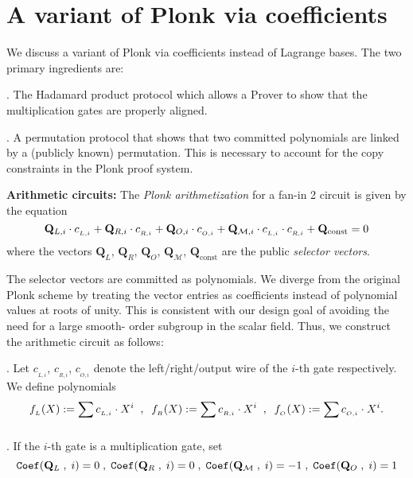 \documentclass[11pt, lettersize, notitlepage, leqno, footskip=0.6cm]{article}
\newcommand{\mc}{\mathcal}
\newcommand{\mbf}{\mathbf}
\newcommand{\mr}{\mathrm}
\newcommand{\vs}{\vspace{-0.15cm}}
\newcommand{\noin}{\noindent}
\numberwithin{equation}{section}
\begin{document}
\section{\fontsize{11}{11}\selectfont A variant of Plonk via coefficients}

We discuss a variant of Plonk via coefficients instead of Lagrange bases. The two primary ingredients are: \vspace{2mm}

\noin 1. The Hadamard product protocol which allows a Prover to show that the multiplication gates are properly aligned. \vspace{1mm}

\noin 2. A permutation protocol that shows that two committed polynomials are linked by a (publicly known) permutation. This is necessary to account for the copy constraints in the Plonk proof system. \bigskip

\noin \textbf{Arithmetic circuits:} The \textit{Plonk arithmetization} for a fan-in 2 circuit is given by the equation \vs $$ \mbf{Q}_{L,i}\cdot c_{_{L,i}} + \mbf{Q}_{R,i}\cdot c_{_{R,i}} + \mbf{Q}_{O,i}\cdot c_{_{O,i}} +  \mbf{Q}_{\mc{M},i}\cdot c_{_{L,i}}\cdot c_{_{R,i}} + \mbf{Q}_{\mr{const}} = 0 \vs $$ where the vectors $\mbf{Q}_{L}$, $\mbf{Q}_{R}$, $\mbf{Q}_{O}$, $\mbf{Q}_{\mc{M}}$, $\mbf{Q}_{\mr{const}}$ are the public \textit{selector vectors}. \vspace{1.5mm}

The selector vectors are committed as polynomials. We diverge from the original Plonk scheme by treating the vector entries as coefficients instead of polynomial values at roots of unity. This is consistent with our design goal of avoiding the need for a large smooth- order subgroup in the scalar field. Thus, we construct the arithmetic circuit as follows: \vspace{2mm}

\noin 1. Let $c_{_{L,i}}$, $c_{_{R,i}}$, $c_{_{O,i}}$ denote the left/right/output wire of the $i$-th gate respectively. We define polynomials \vs $$ f_{_L}(X):= \sum\limits_{} c_{_{L,i}}\cdot X^i\;\;,\;\;f_{_R}(X):= \sum\limits_{} c_{_{R,i}}\cdot X^i\;\;,\;\;f_{_O}(X):= \sum\limits_{} c_{_{O,i}}\cdot X^i.  \vs  $$

\noin 2. If the $i$-th gate is a multiplication gate, set \vs $${\tt{Coef}}(\mbf{Q}_{L}\;,\;i) = 0\;,\;{\tt{Coef}}(\mbf{Q}_{R}\;,\;i) = 0 \;,\; {\tt{Coef}}(\mbf{Q}_{\mc{M}}\;,\;i) = -1\;,\;{\tt{Coef}}(\mbf{Q}_{O}\;,\;i) = 1  $$
\end{document}
